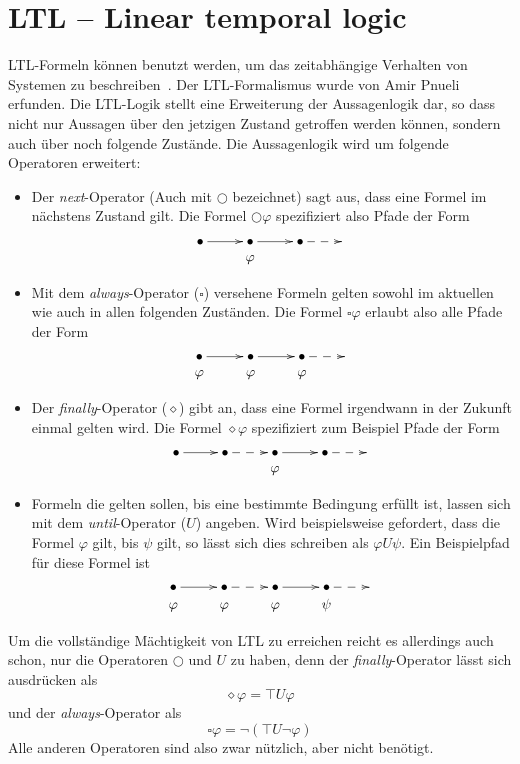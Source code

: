 \section{LTL -- Linear temporal logic}
\label{sec:ltl}
LTL-Formeln können benutzt werden, um das zeitabhängige Verhalten von Systemen zu beschreiben~\cite{principles_of_model_checking}.
Der LTL-Formalismus wurde von Amir Pnueli~\cite{ltlbasics} erfunden.
Die LTL-Logik stellt eine Erweiterung der Aussagenlogik dar, so dass nicht nur Aussagen über den jetzigen Zustand getroffen werden können, sondern auch über noch folgende Zustände.
Die Aussagenlogik wird um folgende Operatoren erweitert:
\begin{itemize}
\item Der \emph{next}-Operator (Auch mit $\bigcirc$ bezeichnet) sagt aus, dass eine Formel im nächstens Zustand gilt.
  Die Formel $\bigcirc\varphi$ spezifiziert also Pfade der Form
  \[ \xymatrix @R=0em {
      \bullet \ar[r] & \bullet \ar[r] & \bullet \ar@{-->}[r] &\\
      & \varphi & &
  }
    \]
\item Mit dem \emph{always}-Operator ($\square$) versehene Formeln gelten sowohl im aktuellen wie auch in allen folgenden Zuständen.
  Die Formel $\square\varphi$ erlaubt also alle Pfade der Form
  \[ \xymatrix @R=0em {
      \bullet \ar[r] & \bullet \ar[r] & \bullet \ar@{-->}[r] &\\
      \varphi & \varphi & \varphi &
  }
    \]
\item Der \emph{finally}-Operator ($\diamond$) gibt an, dass eine Formel irgendwann in der Zukunft einmal gelten wird.
  Die Formel $\diamond\varphi$ spezifiziert zum Beispiel Pfade der Form
  \[ \xymatrix @R=0em {
    \bullet \ar[r] & \bullet \ar@{-->}[r] & \bullet \ar[r] & \bullet \ar@{-->}[r] & \\
    & & \varphi & &
  } \]
\item Formeln die gelten sollen, bis eine bestimmte Bedingung erfüllt ist, lassen sich mit dem \emph{until}-Operator ($U$) angeben.
  Wird beispielsweise gefordert, dass die Formel $\varphi$ gilt, bis $\psi$ gilt, so lässt sich dies schreiben als $\varphi U\psi$.
  Ein Beispielpfad für diese Formel ist
  \[ \xymatrix @R=0em {
    \bullet \ar[r] & \bullet \ar@{-->}[r] & \bullet \ar[r] & \bullet \ar@{-->}[r] & \\
    \varphi & \varphi & \varphi & \psi &
  } \]
\end{itemize}
Um die vollständige Mächtigkeit von LTL zu erreichen reicht es allerdings auch schon, nur die Operatoren $\bigcirc$ und $U$ zu haben, denn der \emph{finally}-Operator lässt sich ausdrücken als
\[ \diamond\varphi = \top U \varphi \]
und der \emph{always}-Operator als
\[ \square\varphi = \lnot (\top U \lnot\varphi) \]
Alle anderen Operatoren sind also zwar nützlich, aber nicht benötigt.